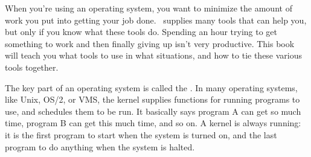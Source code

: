 When you're using an operating system, you want to minimize the amount
of work you put into getting your job done.  \unix\ supplies many
tools that can help you, but only if you know what these tools do.
Spending an hour trying to get something to work and then finally
giving up isn't very productive.  This book will teach you what tools
to use in what situations, and how to tie these various tools together.

The key part of an operating system is called the
.  In many operating systems, like Unix,
OS/2, or VMS, the kernel supplies functions for
running programs to use, and schedules them to be run.  It basically
says program A can get so much time, program B can get this much time,
and so on.  A kernel is always running: it is the first program to
start when the system is turned on, and the last program to do
anything when the system is halted.

